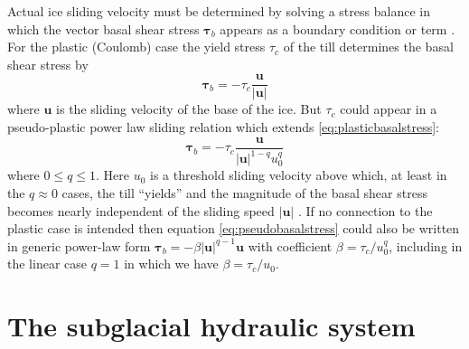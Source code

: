 \documentclass[gmd]{copernicus}   %
\begin{document}
Actual ice sliding velocity must be determined by solving a stress balance in which the vector basal shear stress $\mathbf{\tau}_b$ appears as a boundary condition \citep{SchoofCoulombBlatter} or term \citep{BBssasliding}.  For the plastic (Coulomb) case the yield stress $\tau_c$ of the till determines the basal shear stress by
\begin{equation}
\mathbf{\tau}_b = - \tau_c \frac{\mathbf{u}}{|\mathbf{u}|} \label{eq:plasticbasalstress}
\end{equation}
where $\mathbf{u}$ is the sliding velocity of the base of the ice.  But $\tau_c$ could appear in a pseudo-plastic power law sliding relation \citep[see supplement]{AschwandenAdalgeirsdottirKhroulev} which extends \eqref{eq:plasticbasalstress}:
\begin{equation}
\mathbf{\tau}_b = - \tau_c \frac{\mathbf{u}}{|\mathbf{u}|^{1-q} u_0^q} \label{eq:pseudobasalstress}
\end{equation}
where $0\le q \le 1$.  Here $u_0$ is a threshold sliding velocity above which, at least in the $q\approx 0$ cases, the till ``yields'' and the magnitude of the basal shear stress becomes nearly independent of the sliding speed $|\mathbf{u}|$ \citep{BBssasliding}.  If no connection to the plastic case is intended then equation \eqref{eq:pseudobasalstress} could also be written in generic power-law form $\mathbf{\tau}_b = - \beta |\mathbf{u}|^{q-1} \mathbf{u}$ with coefficient $\beta = \tau_c / u_0^q$, including in the linear case $q=1$ in which we have $\beta = \tau_c/u_0$.


\section{The subglacial hydraulic system} \label{sec:capacity}
\end{document}
